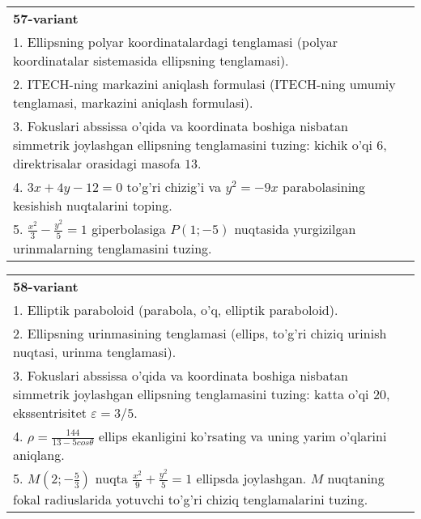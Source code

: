 \documentclass{article}
\begin{document}
\begin{tabular}{m{17cm}}
\textbf{57-variant}\\
1. Ellipsning polyar koordinatalardagi tenglamasi (polyar koordinatalar sistemasida ellipsning tenglamasi).\\

2. ITECH-ning markazini aniqlash formulasi (ITECH-ning umumiy tenglamasi, markazini aniqlash formulasi).\\

3. Fokuslari abssissa o'qida va koordinata boshiga nisbatan simmetrik joylashgan ellipsning tenglamasini tuzing: kichik o'qi $6$, direktrisalar orasidagi masofa $13$.\\

4. $3x + 4y - 12 = 0$ to'g'ri chizig'i va $y^{2} = - 9x$ parabolasining kesishish nuqtalarini toping.\\

5. $\frac{x^{2}}{3} - \frac{y^{2}}{5} = 1$ giperbolasiga $P(1; - 5)$ nuqtasida yurgizilgan urinmalarning tenglamasini tuzing.
\end{tabular}
\vspace{1cm}


\begin{tabular}{m{17cm}}
\textbf{58-variant}\\
1. Elliptik paraboloid (parabola, o'q, elliptik paraboloid).\\

2. Ellipsning urinmasining tenglamasi (ellips, to'g'ri chiziq urinish nuqtasi, urinma tenglamasi).\\

3. Fokuslari abssissa o'qida va koordinata boshiga nisbatan simmetrik joylashgan ellipsning tenglamasini tuzing: katta o'qi $20$, ekssentrisitet $\varepsilon=3/5$.\\

4. $\rho = \frac{144}{13 - 5cos\theta}$ ellips ekanligini ko'rsating va uning yarim o'qlarini aniqlang.\\

5. $M(2; - \frac{5}{3})$ nuqta $\frac{x^{2}}{9} + \frac{y^{2}}{5} = 1$ ellipsda joylashgan. $M$ nuqtaning fokal radiuslarida yotuvchi to'g'ri chiziq tenglamalarini tuzing.  
\end{tabular}
\vspace{1cm}
\end{document}

